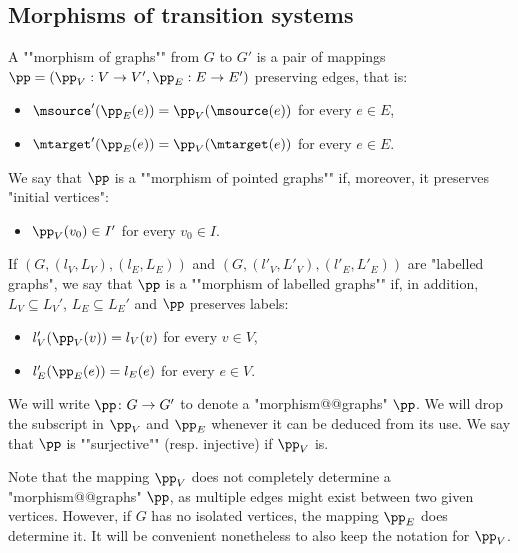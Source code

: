 \documentclass{theoretics}
\begin{document}
\subsection{Morphisms of transition systems}\label{subsec:morphisms-TS}


\begin{definition}\label{def:morphism_graphs}
	\AP A ""morphism of graphs"" from $G$ to $G'$ is a pair of mappings $\pp = (\pp_V: V \rightarrow V', \pp_E: E \rightarrow E')$ preserving edges, that is:
	\begin{itemize}
		\item $\msource'(\pp_E(e))=\pp_V(\msource(e))$ for every $e\in E$,
			
		\item $\mtarget'(\pp_E(e))=\pp_V(\mtarget(e))$ for every $e\in E$.
	\end{itemize}			
	\AP We say that $\pp$ is a ""morphism of pointed graphs"" if, moreover, it preserves "initial vertices":
	\begin{itemize}
		\item $\pp_V(v_0)\in I'$ for every $v_0\in I$. %
	\end{itemize}
	\AP If $(G,(l_V,L_V),(l_E,L_E))$ and $(G,(l'_V,L'_V),(l'_E,L'_E))$ are "labelled graphs", we say that $\pp$ is a ""morphism of labelled graphs"" if, in addition, $L_V \subseteq L_V'$, $L_E \subseteq L_E'$ and $\pp$ preserves labels:
\begin{itemize}
	\item $l_V'(\pp_V(v))=l_V(v)$ for every $v\in V$,
	
	\item $l_E'(\pp_E(e))=l_E(e)$ for every $e\in V$. 
\end{itemize}
\end{definition}



We will write $\pp\colon G \to G'$ to denote a "morphism@@graphs" $\pp$. We will drop the subscript in $\pp_V$ and $\pp_E$ whenever it can be deduced from its use.
\AP We say that $\pp$ is ""surjective"" (resp. injective) if $\pp_V$ is.

Note that the mapping $\pp_V$ does not completely determine a "morphism@@graphs" $\pp$, as multiple edges might exist between two given vertices. However, if $G$ has no isolated vertices, the mapping $\pp_E$ does determine it. It will be convenient nonetheless to also keep the notation for $\pp_V$.
\end{document}
